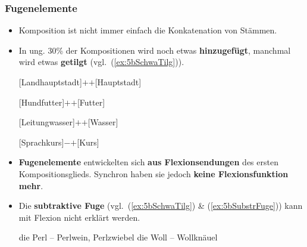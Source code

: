 \begin{frame}
\frametitle{Fugenelemente}

\begin{itemize}
	\item Komposition ist nicht immer einfach die Konkatenation von Stämmen.
	
	\item In ung. 30\% der Kompositionen wird noch etwas \textbf{hinzugefügt}, manchmal wird etwas \textbf{getilgt} (vgl.\ (\ref{ex:5bSchwaTilg})).
	
	\settowidth{} 
	\eal 
		\ex %
		 {[Landhauptstadt]$+$$+$[Hauptstadt]}
		 
		\ex %
		 {[Hundfutter]$+$$+$[Futter]}
		 
		\ex %
		 {[Leitungwasser]$+$$+$[Wasser]}
		 
		\ex\label{ex:5bSchwaTilg} %
		 {[Sprach\alertred{\_}kurs]$-$$+$[Kurs]}
	\zl
		 
\pause

	\item \textbf{Fugenelemente} entwickelten sich \textbf{aus Flexionsendungen} des ersten Kompositionsglieds. Synchron haben sie jedoch \textbf{keine Flexionsfunktion mehr}.
	
	\item Die \textbf{subtraktive Fuge} (vgl.\ (\ref{ex:5bSchwaTilg}) \& (\ref{ex:5bSubstrFuge})) kann mit Flexion nicht erklärt werden.
	
	\eal \label{ex:5bSubstrFuge}
	\ex die Perl -- Perl\alertred{\_}wein, Perl\alertred{\_}zwiebel
	\ex die Woll -- Woll\alertred{\_}knäuel
	\zl
	
\end{itemize}

\end{frame}


